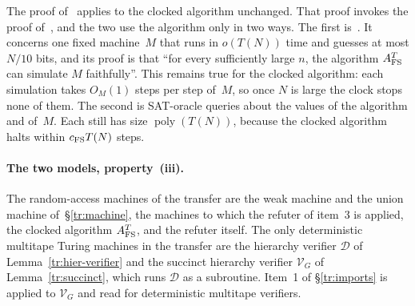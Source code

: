\documentclass[11pt,letterpaper]{article}
\theoremstyle{definition}
\theoremstyle{remark}
\newcommand{\poly}{\operatorname{poly}}
\begin{document}
The proof of~\cite[Theorem~4.6]{CLW} applies to the clocked algorithm
unchanged. That proof invokes the proof of~\cite[Theorem~1.12]{CLW}, and
the two use the algorithm only in two ways. The first
is~\cite[Lemma~4.3]{CLW}. It concerns one fixed machine~$M$ that runs
in $o(T(N))$ time and guesses at most $N/10$ bits, and its proof is that
``for every sufficiently large $n$, the algorithm $A^T_{\rm FS}$ can
simulate $M$ faithfully''. This remains true for the clocked algorithm:
each simulation takes $O_M(1)$ steps per step of~$M$, so once $N$ is
large the clock stops none of them. The second is SAT-oracle queries
about the values of the algorithm and of~$M$. Each still has size
$\poly(T(N))$, because the clocked algorithm halts within
$c_{\rm FS}T(N)$ steps.

\paragraph{The two models, property~(iii).} The random-access machines
of the transfer are the weak machine and the union machine
of~\S\ref{tr:machine}, the machines to which the refuter of item~3 is
applied, the clocked algorithm $A^T_{\rm FS}$, and the refuter itself.
The only deterministic multitape Turing machines in the transfer are
the hierarchy verifier $\mathcal D$ of Lemma~\ref{tr:hier-verifier}
and the succinct hierarchy verifier $\mathcal V_G$ of
Lemma~\ref{tr:succinct}, which runs $\mathcal D$ as a subroutine.
Item~1 of \S\ref{tr:imports} is applied to $\mathcal V_G$ and read for
deterministic multitape verifiers.
\end{document}
